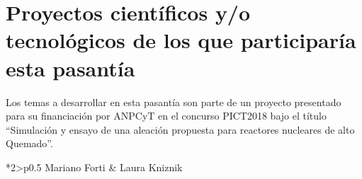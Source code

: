 \section{ Proyectos científicos y/o tecnológicos de los que participaría esta pasantía  }

Los temas a desarrollar en esta pasantía son parte de un proyecto
    presentado para su financiación
por ANPCyT en el concurso PICT2018 bajo el título ``Simulación y ensayo de una
aleación propuesta para reactores nucleares de alto
Quemado''.







\vspace{2cm}
\begin{table}[h!]
  \begin{tabular*}{\textwidth}{ *{2}{>\centering p{0.5\textwidth} } }
    \hline
    Mariano Forti & Laura Kniznik  \\
  \end{tabular*}
\end{table}

